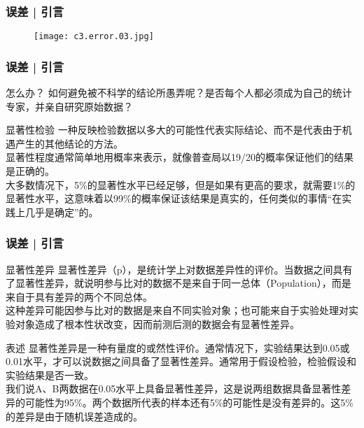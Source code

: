 \begin{frame}
  \frametitle{误差 | 引言}
  \begin{figure}
    \centering
    \texttt{[image: c3.error.03.jpg]}
  \end{figure}
\end{frame}

\begin{frame}
  \frametitle{误差 | 引言}
  \begin{block}{怎么办？}
    如何避免被不科学的结论所愚弄呢？是否每个人都必须成为自己的统计专家，并亲自研究原始数据？
  \end{block}
  \pause
  \begin{block}{显著性检验}
    一种反映检验数据以多大的可能性代表实际结论、而不是代表由于机遇产生的其他结论的方法。\\
    \vspace{0.3em}
    显著性程度通常简单地用概率来表示，就像普查局以19/20的概率保证他们的结果是正确的。\\
    \vspace{0.3em}
大多数情况下，5\%的显著性水平已经足够，但是如果有更高的要求，就需要1\%的显著性水平，这意味着以99\%的概率保证该结果是真实的，任何类似的事情“在实践上几乎是确定”的。
  \end{block}
\end{frame}

\begin{frame}
  \frametitle{误差 | 引言}
  \begin{block}{显著性差异}
显著性差异（p），是统计学上对数据差异性的评价。当数据之间具有了显著性差异，就说明参与比对的数据不是来自于同一总体（Population），而是来自于具有差异的两个不同总体。\\
\vspace{0.3em}
  这种差异可能因参与比对的数据是来自不同实验对象；也可能来自于实验处理对实验对象造成了根本性状改变，因而前测后测的数据会有显著性差异。
  \end{block}
  \pause
  \begin{block}{表述}
    显著性差异是一种有量度的或然性评价。通常情况下，实验结果达到0.05或0.01水平，才可以说数据之间具备了显著性差异。通常用于假设检验，检验假设和实验结果是否一致。\\
    \vspace{0.3em}
我们说A、B两数据在0.05水平上具备显著性差异，这是说两组数据具备显著性差异的可能性为95\%。两个数据所代表的样本还有5\%的可能性是没有差异的。这5\%的差异是由于随机误差造成的。\\
  \end{block}
\end{frame}

